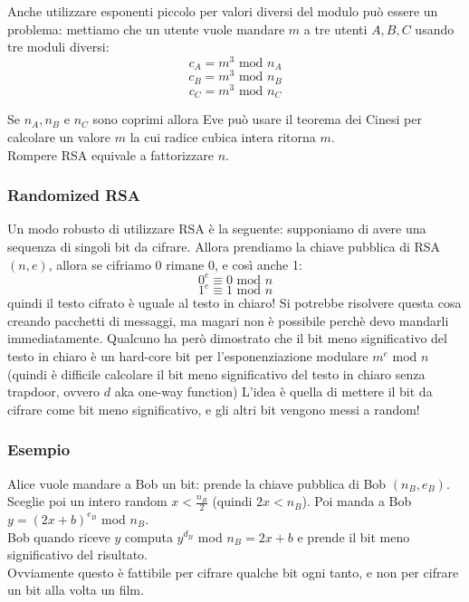 Anche utilizzare esponenti piccolo per valori diversi del modulo può essere un problema: mettiamo che un utente vuole mandare $m$ a tre utenti $A,B,C$ usando tre moduli diversi:
\begin{equation*}
	c_A = m^3 \text{ mod } n_A
\end{equation*}
\begin{equation*}
	c_B = m^3 \text{ mod } n_B
\end{equation*}
\begin{equation*}
	c_C = m^3 \text{ mod } n_C
\end{equation*}

Se $n_A,n_B$ e $n_C$ sono coprimi allora Eve può usare il teorema dei Cinesi per calcolare un valore $m$ la cui radice cubica intera ritorna $m$.\\

Rompere RSA equivale a fattorizzare $n$.

\subsubsection*{Randomized RSA}

Un modo robusto di utilizzare RSA è la seguente: supponiamo di avere una sequenza di singoli bit da cifrare. Allora prendiamo la chiave pubblica di RSA $(n,e)$, allora se cifriamo 0 rimane 0, e così anche 1:
\begin{equation*}
	0^e \equiv 0 \text { mod } n
\end{equation*}
\begin{equation*}
	1^e \equiv 1 \text { mod } n
\end{equation*}
quindi il testo cifrato è uguale al testo in chiaro!
Si potrebbe risolvere questa cosa creando pacchetti di messaggi, ma magari non è possibile perchè devo mandarli immediatamente. Qualcuno ha però dimostrato che il bit meno significativo del testo in chiaro è un hard-core bit per l'esponenziazione modulare $m^e$ mod $n$ (quindi è difficile calcolare il bit meno significativo del testo in chiaro senza trapdoor, ovvero $d$ aka one-way function)
L'idea è quella di mettere il bit da cifrare come bit meno significativo, e gli altri bit vengono messi a random!
\subsubsection*{Esempio}
Alice vuole mandare a Bob un bit: prende la chiave pubblica di Bob $(n_B, e_B)$.
Sceglie poi un intero random $x < \frac{n_B}{2}$ (quindi $2x < n_B$).
Poi manda a Bob $y=(2x+b)^{e_B}$ mod $n_B$.\\
Bob quando riceve $y$ computa $y^{d_B}$ mod $n_B = 2x + b$ e prende il bit meno significativo del risultato.\\

Ovviamente questo è fattibile per cifrare qualche bit ogni tanto, e non per cifrare un bit alla volta un film.

